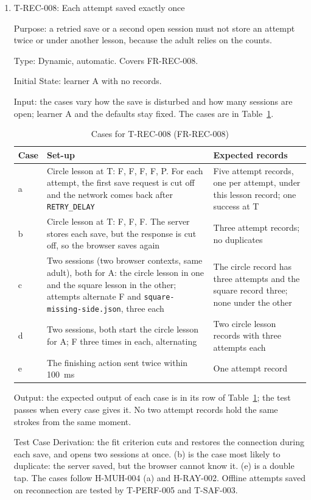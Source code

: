 \documentclass[12pt, titlepage]{article}
\newcommand{\testitem}[1]{\item #1\par\nopagebreak}
\begin{document}
\begin{enumerate}
\testitem{T-REC-008: Each attempt saved exactly once}

Purpose: a retried save or a second open session must not store an attempt
twice or under another lesson, because the adult relies on the counts.

Type: Dynamic, automatic. Covers FR-REC-008.

Initial State: learner A with no records.

Input: the cases vary how the save is disturbed and how many sessions are
open; learner A and the defaults stay fixed. The cases are in
Table~\ref{tab:t-rec-008}.

\begin{table}[htbp]
\centering\small
\caption{Cases for T-REC-008 (FR-REC-008)}
\label{tab:t-rec-008}
\begin{tabularx}{\textwidth}{@{}l >{\raggedright\arraybackslash}X
  >{\raggedright\arraybackslash}X@{}}
\toprule
\textbf{Case} & \textbf{Set-up} & \textbf{Expected records}\\
\midrule
a & Circle lesson at T: F, F, F, F, P. For each attempt, the first save
request is cut off and the network comes back after
\texttt{RETRY\_DELAY} & Five attempt records, one per attempt, under this
lesson record; one success at T\\
b & Circle lesson at T: F, F, F. The server stores each save, but the
response is cut off, so the browser saves again & Three attempt records; no
duplicates\\
c & Two sessions (two browser contexts, same adult), both for A: the circle
lesson in one and the square lesson in the other; attempts alternate F and
\texttt{square-\allowbreak{}missing-\allowbreak{}side.json}, three each &
The circle record has three attempts and the square record three; none
under the other\\
d & Two sessions, both start the circle lesson for A; F three times in
each, alternating & Two circle lesson records with three attempts each\\
e & The finishing action sent twice within 100~ms & One attempt record\\
\bottomrule
\end{tabularx}
\end{table}

Output: the expected output of each case is in its row of
Table~\ref{tab:t-rec-008}; the test passes when every case gives it. No two
attempt records hold the same strokes from the same moment.

Test Case Derivation: the fit criterion cuts and restores the connection
during each save, and opens two sessions at once. (b) is the case most
likely to duplicate: the server saved, but the browser cannot know it. (e)
is a double tap. The cases follow H-MUH-004 (a) and H-RAY-002. Offline
attempts saved on reconnection are tested by T-PERF-005 and T-SAF-003.


\end{enumerate}
\end{document}

